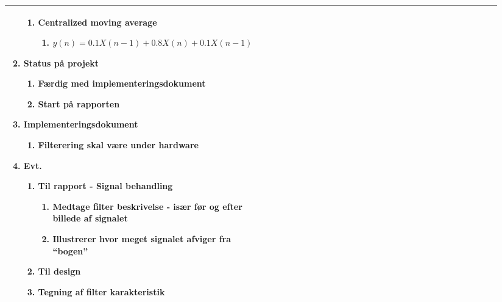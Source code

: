 \begin{longtable}{|p{0.24\linewidth}|p{0.7\linewidth}|}
\begin{enumerate}
\begin{enumerate}
				\item Centralized moving average 
				\begin{enumerate}
					\item  $y(n) = 0.1X(n-1) + 0.8X(n) + 0.1X(n-1) $
				\end{enumerate}
			\end{enumerate}
			\item Status på projekt
			\begin{enumerate}
				\item Færdig med implementeringsdokument
				\item Start på rapporten 
			\end{enumerate}
			\item Implementeringsdokument
			\begin{enumerate}
				\item Filterering skal være under hardware 
			\end{enumerate}
			\item Evt. 
			\begin{enumerate}
				\item Til rapport - Signal behandling
				\begin{enumerate}
					\item Medtage filter beskrivelse - især før og efter billede af signalet 
					\item Illustrerer hvor meget signalet afviger fra “bogen”
				\end{enumerate}
				\item Til design 
				\item Tegning af filter karakteristik
			\end{enumerate}
		\end{enumerate}
		\\ \hline
	\end{longtable}
	
